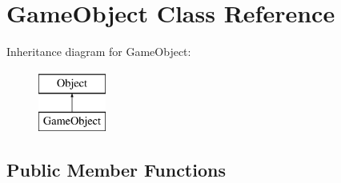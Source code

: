 \hypertarget{class_game_object}{
\section{GameObject Class Reference}
\label{class_game_object}
}
Inheritance diagram for GameObject:\begin{figure}[H]
\begin{center}
\leavevmode
\includegraphics[height=2.000000cm]{class_game_object}
\end{center}
\end{figure}
\subsection*{Public Member Functions}
